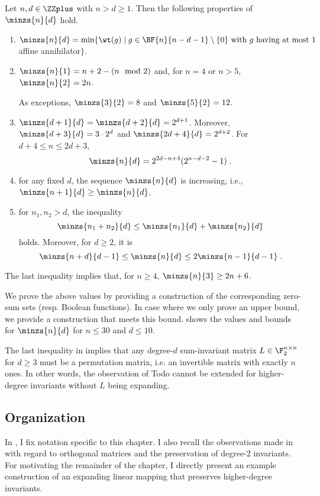 \begin{theorem}
Let $n,d \in \ZZplus$ with $n > d \geq 1$. Then the following properties of $\minzs{n}{d}$ hold.
 \renewcommand{\labelenumi}{(\roman{enumi})}
\begin{enumerate}
    \item $\minzs{n}{d} = \min\{ \wt(g) \mid g \in \BF{n}{n-d-1} \setminus \{0\} \text{ with } g \text{ having at most 1}$ affine annihilator$\}$.
    \vspace{.3em}
    \item $\minzs{n}{1} = n+2-(n \mod 2)$ and, for $n = 4$ or $n > 5$, $\minzs{n}{2} = 2n$.
    
    As exceptions, $\minzs{3}{2} = 8$ and $\minzs{5}{2} = 12$.
    \vspace{.3em}
    \item $\minzs{d+1}{d} = \minzs{d+2}{d} = 2^{d+1}$. Moreover, $\minzs{d+3}{d} = 3 \cdot 2^d$ and $\minzs{2d+4}{d} = 2^{d+2}$. For $d+4 \leq n \leq 2d+3$,  \[\minzs{n}{d} = 2^{2d-n+4}(2^{n-d-2}-1)\;.\]
    \item for any fixed $d$, the sequence $\minzs{n}{d}$ is increasing, i.e., $\minzs{n+1}{d} \geq \minzs{n}{d}$.
    \vspace{.3em}
    \item for $n_1, n_2 > d$, the inequality \[\minzs{n_1+n_2}{d} \leq \minzs{n_1}{d} + \minzs{n_2}{d}\] holds. Moreover, for $d \geq 2$, it is \[\minzs{n+d}{d-1} \leq \minzs{n}{d} \leq 2 \minzs{n-1}{d-1}\;.\]
\end{enumerate}
The last inequality implies that, for $n \geq 4$,  $\minzs{n}{3} \geq 2n +6$.
\end{theorem}

We prove the above values by providing a construction of the corresponding zero-sum sets (resp. Boolean functions). In case where we only prove an upper bound, we provide a construction that meets this bound.  shows the values and bounds for $\minzs{n}{d}$ for $n \leq 30$ and $d \leq 10$.

The last inequality in  implies that any degree-$d$ sum-invariant matrix $L \in \F_2^{n \times n}$ for $d \geq 3$ must be a permutation matrix, i.e. an invertible matrix with exactly $n$ ones. In other words, the observation of Todo \etal cannot be extended for higher-degree invariants without $L$ being expanding.

\subsection{Organization} In , I fix notation specific to this chapter. I also recall the observations made in~\cite{NonlinInv} with regard to orthogonal matrices and the preservation of degree-$2$ invariants. For motivating the remainder of the chapter, I directly present an example construction of an expanding linear mapping that preserves higher-degree invariants. 

